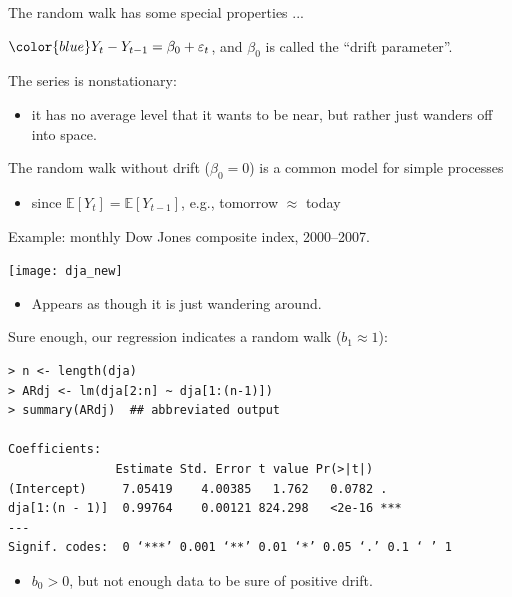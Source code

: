 \documentclass[12pt,xcolor=svgnames]{beamer}
\newcommand{\rd}{\color{red}}
\newcommand{\bl}{\color{blue}}
\newcommand{\ds}[1]{\mathds{#1}}
\newcommand{\sk}{\vspace{.4cm}}
\newcommand{\nochap}{\vspace{0.5cm}}
\newcommand{\E}{\ds{E}}
\begin{document}
\begin{frame}
\nochap

The random walk has some special properties ...

\sk
$\bl Y_t - Y_{t-1} = \beta_0 + \varepsilon_t$, 
and $\beta_0$ is called the ``drift parameter''.

\sk
The series is {\bl nonstationary}: 
\begin{itemize}
\item it has no average level that it wants to be near, 
but rather just wanders off into space.
\end{itemize}

\sk 
The random walk {\rd without drift ($\beta_0 = 0$)} is a common model for
simple processes
\begin{itemize}
\item since {\bl $\E[Y_t] = \E[Y_{t-1}]$}, e.g., tomorrow $\approx$
today
\end{itemize}

\end{frame}

\iffalse
\begin{frame}
\nochap

{\bl Example:} monthly Dow Jones composite index, 2000--2007.

\begin{center}
\texttt{[image: dja\_new]}
\end{center}
\begin{itemize}
\item Appears as though it is just wandering around.
\end{itemize}
\end{frame}


\begin{frame}[fragile]
\nochap

Sure enough, our regression indicates a random walk ($b_1 \approx 1$):

{\bl \footnotesize
\begin{verbatim}
> n <- length(dja)
> ARdj <- lm(dja[2:n] ~ dja[1:(n-1)])
> summary(ARdj)  ## abbreviated output

Coefficients:
               Estimate Std. Error t value Pr(>|t|)    
(Intercept)     7.05419    4.00385   1.762   0.0782 .  
dja[1:(n - 1)]  0.99764    0.00121 824.298   <2e-16 ***
---
Signif. codes:  0 ‘***’ 0.001 ‘**’ 0.01 ‘*’ 0.05 ‘.’ 0.1 ‘ ’ 1
\end{verbatim}
}

\begin{itemize}
\item $b_0 > 0$, but not enough data to be {\rd sure} of positive drift.
\end{itemize}
\end{frame}
\end{document}

